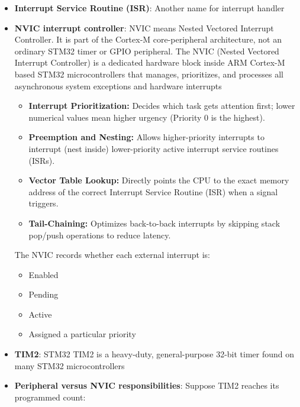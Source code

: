\documentclass{report}
\begin{document}
\begin{itemize}
            \bigbreak \noindent 
            CMSIS assigns negative interrupt numbers to core exceptions and nonnegative numbers to device-specific interrupts
        \item \textbf{Interrupt Service Routine (ISR)}: Another name for interrupt handler 
        \item \textbf{NVIC interrupt controller}: NVIC means Nested Vectored Interrupt Controller. It is part of the Cortex‑M core-peripheral architecture, not an ordinary STM32 timer or GPIO peripheral.
            \bigbreak \noindent 
            The NVIC (Nested Vectored Interrupt Controller) is a dedicated hardware block inside ARM Cortex-M based STM32 microcontrollers that manages, prioritizes, and processes all asynchronous system exceptions and hardware interrupts
            \begin{itemize}
                \item \textbf{Interrupt Prioritization:} Decides which task gets attention first; lower numerical values mean higher urgency (Priority 0 is the highest).
                \item \textbf{Preemption and Nesting:} Allows higher-priority interrupts to interrupt (nest inside) lower-priority active interrupt service routines (ISRs). 
                \item \textbf{Vector Table Lookup:} Directly points the CPU to the exact memory address of the correct Interrupt Service Routine (ISR) when a signal triggers. 
                \item \textbf{Tail-Chaining:} Optimizes back-to-back interrupts by skipping stack pop/push operations to reduce latency.
            \end{itemize}
            \bigbreak \noindent 
            The NVIC records whether each external interrupt is:
            \begin{itemize}
                \item Enabled
                \item Pending
                \item Active
                \item Assigned a particular priority
            \end{itemize}
        \item \textbf{TIM2}: STM32 TIM2 is a heavy-duty, general-purpose 32-bit timer found on many STM32 microcontrollers
        \item \textbf{Peripheral versus NVIC responsibilities}: Suppose TIM2 reaches its programmed count:

\end{itemize}
\end{document}
